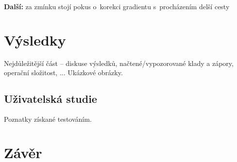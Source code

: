 \documentclass[11pt,a4paper,oneside]{article}
\begin{document}
	\textbf{Další:} \; za zmínku stojí pokus o~korekci gradientu s~procházením delší cesty 

	\section{Výsledky}
	Nejdůležitější část -- diskuse výsledků, 
	načtené/vypozorované klady a zápory, operační složitost, ...
	Ukázkové obrázky.

	\subsection{Uživatelská studie}
	Poznatky získané testováním.

	\section{Závěr}

	
	
\end{document}

